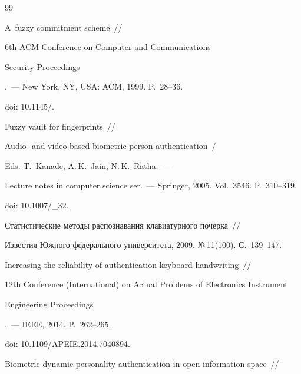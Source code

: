 {{\begin{thebibliography}{99}




A~fuzzy commitment scheme~/\!\!/ {6th ACM Conference on Computer and Communications


 Security Proceedings}.~--- New York, NY, USA: ACM, 1999. P.~28--36. 


 doi: 10.1145\!/.









Fuzzy vault for fingerprints~/\!\!/  


Audio- and video-based biometric person authentication~/


Eds. T.~Kanade, A.\,K.~Jain, N.\,K.~Ratha.~---  


Lecture notes in computer science ser.~--- Springer, 2005. Vol.~3546. P.~310--319.


doi: 10.1007\!/\_32.









Статистические методы распознавания клавиатурного почерка~/\!\!/ 


{Известия Южного федерального университета}, 2009. №\,11(100). С.~139--147.









Increasing the reliability of authentication keyboard handwriting~/\!\!/ 


{12th  Conference (International) on Actual Problems of Electronics Instrument 


Engineering Proceedings}.~--- IEEE, 2014. P.~262--265.


doi: 10.1109\!/\!APEIE.2014.7040894.









Biometric dynamic personality authentication in open information space~/\!\!/ 



\end{thebibliography}}}
